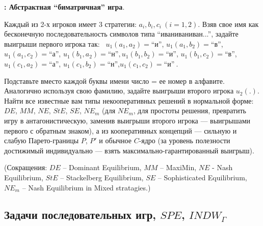\documentclass[a4paper,12pt]{article}
\begin{document}
\begin{exmp}
{\bf : Абстрактная ``биматричная'' игра}. {\rm Каждый из
2-х игроков имеет 3 стратегии: $a_i, b_i, c_i~ (i=1,2)$.
Взяв свое имя как бесконечную последовательность символов
типа ``иваниваниван...'', задайте выигрыши первого игрока
так:~ $u_1(a_1,a_{2}) = $``и'', $ u_1(a_1,b_{2}) = $``в'',$
u_1(a_1,c_{2}) = $``а'', $ u_1(b_1,a_{2}) = $``н''$,
u_1(b_1,b_{2}) = $``и'', $ u_1(b_1,c_{2}) = $``в'',$
u_1(c_1,a_{2}) = $``а'', $ u_1(c_1,b_{2}) = $``н'',$
u_1(c_1,c_{2}) = $``и''$~ $.

Подставьте вместо каждой буквы имени число = ее номер в
алфавите. Аналогично используя свою фамилию, задайте
выигрыши второго игрока $u_2(.)$. Найти все известные вам
типы некооперативных решений в нормальной форме: $DE$,
$MM$, $NE$, $StE$, $SE$, $NE_m$ (для $NE_m$, для простоты
решения, превратить игру в антагонистическую, заменив
выигрыши второго игрока --- выигрышами первого с обратным
знаком), а из кооперативных концепций --- сильную и слабую
Парето-границы $P$, $P'$ и обычное $C$-ядро (за уровень
полезности достижимый индивидуально
--- взять максимально-гарантированный выигрыш).

(Сокращения: $DE$ -- Dominant Equilibrium, $MM$ -- MaxiMin,
$NE$ - Nash Equilibrium, $StE$ -- Stackelberg Equilibrium,
$SE$ -- Sophisticated Equilibrium, $NE_m$ -- Nash
Equilibrium in Mixed stratagies.) }\end{exmp}


\subsection{Задачи последовательных игр, $SPE$, $INDW_{\Gamma}$}
\end{document}
